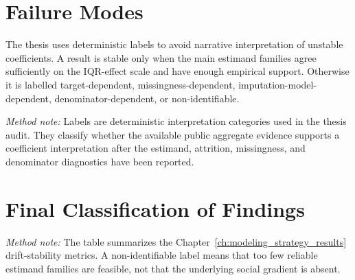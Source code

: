 \section{Failure Modes}

The thesis uses deterministic labels to avoid narrative interpretation of unstable coefficients. A result is stable only when the main estimand families agree sufficiently on the IQR-effect scale and have enough empirical support. Otherwise it is labelled target-dependent, missingness-dependent, imputation-model-dependent, denominator-dependent, or non-identifiable.

\begin{table}[H]
\centering
\scriptsize
\caption{Failure modes in public aggregate panels. The labels classify interpretation risk after target definition, attrition, coefficient stability, and simulation diagnostics have been reported.}
\label{tab:failure_modes_public_aggregate_panels}


\vspace{0.35em}
\begin{minipage}{0.94\textwidth}
\scriptsize \textit{Method note:} Labels are deterministic interpretation categories used in the thesis audit. They classify whether the available public aggregate evidence supports a coefficient interpretation after the estimand, attrition, missingness, and denominator diagnostics have been reported.
\end{minipage}
\end{table}

\section{Final Classification of Findings}

\begin{table}[H]
\centering
\scriptsize
\caption{Final classification of Eurostat unmet-care findings. Labels are generated from the drift-stability summary and deterministic rules; the table reports the primary classification used for interpretation.}
\label{tab:final_classification_eurostat_findings}


\vspace{0.35em}
\begin{minipage}{0.94\textwidth}
\scriptsize \textit{Method note:} The table summarizes the Chapter~\ref{ch:modeling_strategy_results} drift-stability metrics. A non-identifiable label means that too few reliable estimand families are feasible, not that the underlying social gradient is absent.
\end{minipage}
\end{table}

